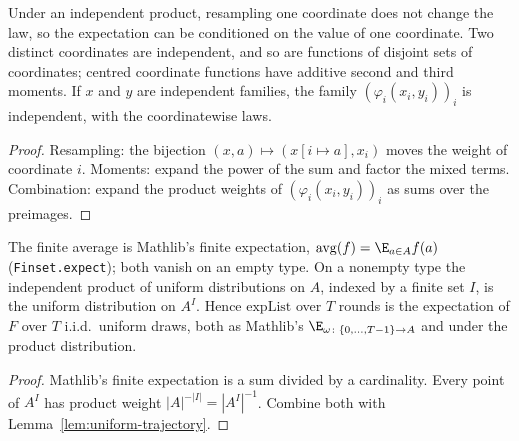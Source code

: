 \begin{lemma}\label{lem:independent}
\leanok{}
Under an independent product, resampling one coordinate does not change the law, so the
expectation can be conditioned on the value of one coordinate. Two distinct coordinates are
independent, and so are functions of disjoint sets of coordinates; centred coordinate functions
have additive second and third moments. If $x$ and $y$ are independent families, the family
$(\varphi_i(x_i,y_i))_i$ is independent, with the coordinatewise laws.
\end{lemma}
\begin{proof}\leanok
Resampling: the bijection $(x,a)\mapsto(x[i\mapsto a],x_i)$ moves the weight of coordinate $i$.
Moments: expand the power of the sum and factor the mixed terms. Combination: expand the product
weights of $(\varphi_i(x_i,y_i))_i$ as sums over the preimages.
\end{proof}
\begin{lemma}\label{lem:bridge}
\leanok{}
The finite average is Mathlib's finite expectation, $\operatorname{avg}(f)=\E_{a\in A}f(a)$
(\texttt{Finset.expect}); both vanish on an empty type. On a nonempty type the independent
product of uniform distributions on $A$, indexed by a finite set $I$, is the uniform
distribution on $A^I$. Hence $\mathrm{expList}$ over $T$ rounds is the expectation of
$F$ over $T$ i.i.d.\ uniform draws, both as Mathlib's $\E_{\omega\colon\{0,\ldots,T-1\}\to A}$
and under the product distribution.
\end{lemma}
\begin{proof}\leanok
Mathlib's finite expectation is a sum divided by a cardinality. Every point of $A^I$ has
product weight $|A|^{-|I|}=|A^I|^{-1}$. Combine both with Lemma~\ref{lem:uniform-trajectory}.
\end{proof}
